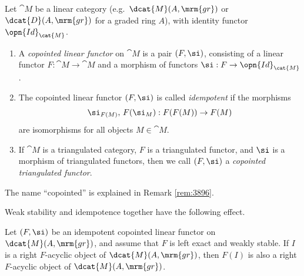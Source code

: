 \begin{dfn} \label{dfn:3896} 
Let $\cat{M}$ be a linear category (e.g.\ $\dcat{M}(A, \mrm{gr})$ or
$\dcat{D}(A, \mrm{gr})$ for a graded ring $A$), with identity functor 
$\opn{Id}_{\cat{M}}$.
\begin{enumerate}
\item A {\em copointed linear functor}%
on $\cat{M}$ is a pair 
$(F, \si)$, consisting of a linear functor 
$F : \cat{M} \to \cat{M}$ and a morphism of functors 
$\si : F \to \opn{Id}_{\cat{M}}$.

\item The copointed linear functor $(F, \si)$ is called 
{\em idempotent}%
if the morphisms 
\[ \si_{F(M)}, \, F(\si_M) : F(F(M)) \to F(M) \]
are isomorphisms for all objects $M \in \cat{M}$. 

\item If $\cat{M}$ is a triangulated category, $F$ is a triangulated functor, 
and $\si$ is a morphism of triangulated functors, then we call 
$(F, \si)$ a {\em copointed triangulated functor}. 
\end{enumerate}
\end{dfn}

The name ``copointed'' is explained in Remark \ref{rem:3896}. 

Weak stability and idempotence together have the following effect. 

\begin{lem} \label{lem:3895}
Let $(F, \si)$ be an idempotent copointed linear functor on 
$\dcat{M}(A, \mrm{gr})$, and assume that $F$ is left exact and weakly stable. 
If $I$ is a right $F$-acyclic object of $\dcat{M}(A, \mrm{gr})$, then $F(I)$ is 
also a right $F$-acyclic object of $\dcat{M}(A, \mrm{gr})$.
\end{lem}

